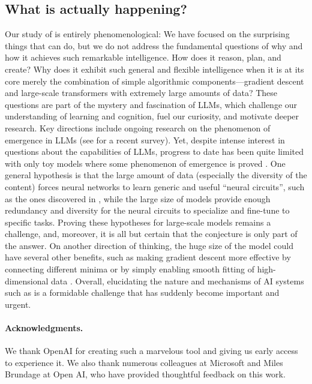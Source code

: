 \subsection{What is actually happening?} \label{sec:whatsgoingon}
Our study of {\DV} is entirely phenomenological: We have focused on the surprising things that {\DV} can do, but we do not address the fundamental questions of why and how it achieves such remarkable intelligence. How does it reason, plan, and create? Why does it exhibit such general and flexible intelligence when it is at its core merely the combination of simple algorithmic components---gradient descent and large-scale transformers with extremely large amounts of data? These questions are part of the mystery and fascination of LLMs, which challenge our understanding of learning and cognition, fuel our curiosity, and motivate deeper research. Key directions include ongoing research on the phenomenon of emergence in LLMs (see \cite{wei2022emergent} for a recent survey). Yet, despite intense interest in questions about the capabilities of LLMs, progress to date has been quite limited with only toy models where some phenomenon of emergence is proved \cite{barak2022hidden, ahn2022learning,jelassi2022vision}. One general hypothesis \cite{olah2020zoom} is that the large amount of data (especially the  diversity of the content) forces neural networks to learn generic and useful ``neural circuits'', such as the ones discovered in \cite{olsson2022context, zhang2022unveiling, liu2022transformers}, while the large size of models provide enough redundancy and diversity for the neural circuits to specialize and fine-tune to specific tasks. 
Proving these hypotheses for large-scale models remains a challenge, and, moreover, it is all but certain that the conjecture is only part of the answer. On another direction of thinking, the huge size of the model could have several other benefits, such as making gradient descent more effective by connecting different minima \cite{venturi2019spurious} or by simply enabling smooth fitting of high-dimensional data \cite{pmlr-v49-eldan16, NEURIPS2021_f197002b}. Overall, elucidating the nature and mechanisms of AI systems such as {\DV} is a formidable challenge that has suddenly become important and urgent.
\newline

\paragraph{Acknowledgments.} We thank OpenAI for creating such a marvelous tool and giving us early access to experience it. We also thank numerous colleagues at Microsoft and Miles Brundage at Open AI, who have provided thoughtful feedback on this work.